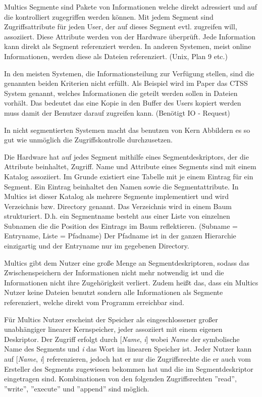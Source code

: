 \documentclass[11pt,technote]{IEEEtran}
\begin{document}
		    Multics Segmente sind Pakete von Informationen welche direkt adressiert und auf die kontrolliert zugegriffen werden k\"onnen.
		    Mit jedem Segment sind Zugriffsattribute f\"ur jeden User, der auf dieses Segment evtl. zugreifen will, assoziiert.
		    Diese Attribute werden von der Hardware \"uberpr\"uft. Jede Information kann direkt als Segment referenziert werden.
		    In anderen Systemen, meist online Informationen, werden diese als Dateien referenziert. (Unix, Plan 9 etc.)
		  
		    In den meisten Systemen, die Informationsteilung zur Verf\"ugung stellen, sind die genannten beiden Kriterien nicht erf\"ullt.
		    Als Beispiel wird im Paper \cite{inproc:multics} das CTSS System genannt, welches Informationen die geteilt werden sollen in Dateien vorh\"alt.
		    Das bedeutet das eine Kopie in den Buffer des Users kopiert werden muss damit der Benutzer darauf zugreifen kann. (Ben\"otigt IO - Request)
		  
		    In nicht segmentierten Systemen macht das benutzen von Kern Abbildern es so gut wie unm\"oglich die Zugriffskontrolle durchzusetzen.
		  
        Die Hardware hat auf jedes Segment mithilfe eines Segmentdeskriptors, der die Attribute beinhaltet, Zugriff.
		    Name und Attribute eines Segments sind mit einem Katalog assoziiert. Im Grunde existiert eine Tabelle mit je einem Eintrag f\"ur ein Segment. 
		    Ein Eintrag beinhaltet den Namen sowie die Segmentattribute. In Multics ist dieser Katalog als mehrere
		    Segmente implementiert und wird Verzeichnis bzw. Directory genannt. Das Verzeichnis wird in einem Baum strukturiert.
		    D.h. ein Segmentname besteht aus einer Liste von einzelnen Subnamen die die Position des Eintrags im Baum reflektieren.
		    (Subname = Entryname, Liste = Pfadname)
		    Der Pfadname ist in der ganzen Hierarchie einzigartig und der Entryname nur im gegebenen Directory.
		     
		    Multics gibt dem Nutzer eine gro\ss e Menge an Segmentdeskriptoren, sodass das Zwischenspeichern der Informationen nicht mehr notwendig ist und 
		    die Informationen nicht ihre Zugeh\"origkeit verliert. Zudem hei\ss t das, dass ein Multics Nutzer keine Dateien benutzt sondern alle Informationen
		    als Segmente referenziert, welche direkt vom Programm erreichbar sind.
		 
        F\"ur Multics Nutzer erscheint der Speicher als eingeschlossener gro\ss er unabh\"angiger linearer Kernspeicher,
        jeder assoziiert mit einem eigenen Deskriptor. 
        Der Zugriff erfolgt durch [\textit{Name}, \textit{i}] wobei \textit{Name} der symbolische Name des Segments und \textit{i} das Wort
        im linearen Speicher ist. Jeder Nutzer kann auf [\textit{Name}, \textit{i}] referenzieren, jedoch hat er nur die Zugriffsrechte die er auch vom Ersteller
	      des Segments zugewiesen bekommen hat und die im Segmentdeskriptor eingetragen sind.
	      Kombinationen von den folgenden Zugriffsrechten ''read'', ''write'', ''execute'' und ''append'' sind m\"oglich.
	 
\end{document}
